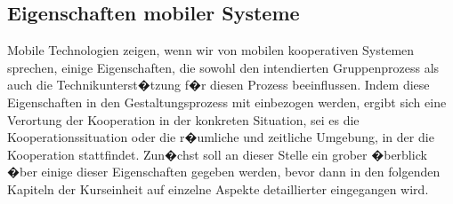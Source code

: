 \subsection{Eigenschaften mobiler Systeme}

Mobile Technologien zeigen, wenn wir von mobilen kooperativen Systemen sprechen, einige Eigenschaften, die sowohl den intendierten Gruppenprozess als auch die Technikunterst�tzung f�r diesen Prozess beeinflussen. Indem diese Eigenschaften in den Gestaltungsprozess mit einbezogen werden, ergibt sich eine Verortung der Kooperation in der konkreten Situation, sei es die Kooperationssituation oder die r�umliche und zeitliche Umgebung, in der die Kooperation stattfindet. Zun�chst soll an dieser Stelle ein grober �berblick �ber einige dieser Eigenschaften gegeben werden, bevor dann in den folgenden Kapiteln der Kurseinheit auf einzelne Aspekte detaillierter eingegangen wird.

